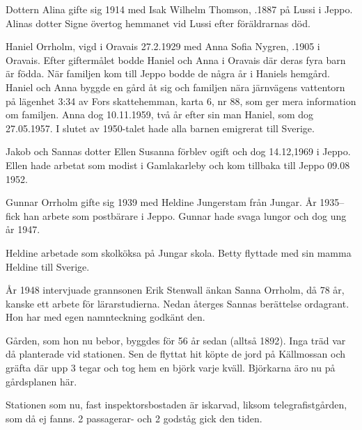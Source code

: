 Dottern Alina gifte sig 1914 med Isak Wilhelm Thomson, .1887 på Lussi i Jeppo. Alinas dotter Signe övertog hemmanet vid Lussi efter föräldrarnas död.

Haniel Orrholm, vigd i Oravais 27.2.1929 med Anna Sofia Nygren, .1905 i Oravais. Efter giftermålet bodde Haniel och Anna i Oravais där deras fyra barn är födda. När familjen kom till Jeppo bodde de några år i Haniels hemgård. Haniel och Anna byggde en gård åt sig och familjen nära järnvägens vattentorn på lägenhet 3:34 av Fors skattehemman, karta 6, nr 88, som ger mera information om familjen. Anna dog 10.11.1959, två år efter sin man Haniel, som dog 27.05.1957. I slutet av 1950-talet hade alla barnen emigrerat till Sverige.

Jakob och Sannas dotter Ellen Susanna förblev ogift och dog 14.12,1969 i Jeppo. Ellen hade arbetat som modist i Gamlakarleby och kom tillbaka till Jeppo 09.08 1952.

Gunnar Orrholm gifte sig 1939 med Heldine Jungerstam från Jungar. År 1935-- fick han arbete som postbärare i Jeppo. Gunnar hade svaga lungor och dog ung år 1947.
\begin{jhchildren}
  \item {}
  \item {}
\end{jhchildren}
Heldine arbetade som skolköksa på Jungar skola. Betty flyttade med sin mamma Heldine till Sverige.


%

År 1948 intervjuade grannsonen Erik Stenwall änkan Sanna Orrholm, då 78 år, kanske ett arbete för lärarstudierna. Nedan återges Sannas berättelse ordagrant. Hon har med egen namnteckning godkänt den.


Gården, som hon nu bebor, byggdes för 56 år sedan (alltså 1892). Inga träd var då planterade vid stationen. Sen de flyttat hit köpte de jord på Källmossan och gräfta där upp 3 tegar och tog hem en björk varje kväll. Björkarna äro nu på gårdsplanen här.

Stationen som nu, fast inspektorsbostaden är iskarvad, liksom telegrafistgården, som då ej fanns. 2 passagerar- och 2 godståg gick den tiden.

